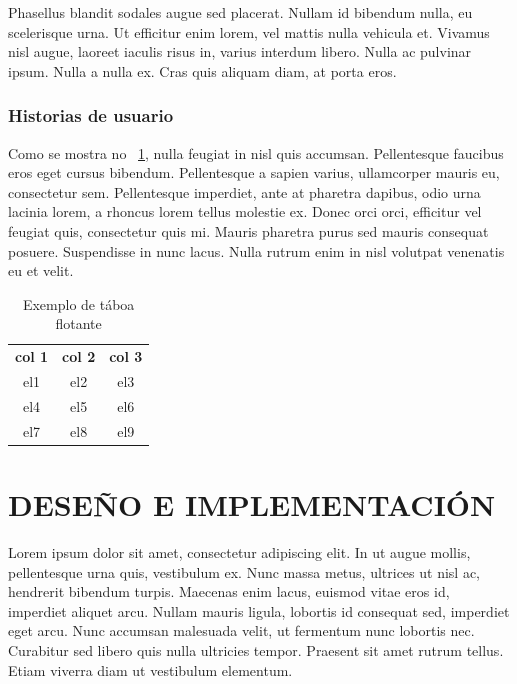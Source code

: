 \documentclass{pfc}
\begin{document}
Phasellus blandit sodales augue sed placerat. Nullam id bibendum
nulla, eu scelerisque urna. Ut efficitur enim lorem, vel mattis nulla
vehicula et. Vivamus nisl augue, laoreet iaculis risus in, varius
interdum libero. Nulla ac pulvinar ipsum. Nulla a nulla ex. Cras quis
aliquam diam, at porta eros.

\subsection{Historias de usuario}

Como se mostra no \tablename~\ref{tab:exemplo}, nulla feugiat in nisl
quis accumsan. Pellentesque faucibus eros eget cursus
bibendum. Pellentesque a sapien varius, ullamcorper mauris eu,
consectetur sem. Pellentesque imperdiet, ante at pharetra dapibus,
odio urna lacinia lorem, a rhoncus lorem tellus molestie ex. Donec
orci orci, efficitur vel feugiat quis, consectetur quis mi. Mauris
pharetra purus sed mauris consequat posuere. Suspendisse in nunc
lacus. Nulla rutrum enim in nisl volutpat venenatis eu et velit.

\begin{table}
  \centering
  \caption{Exemplo de táboa flotante}
  \begin{tabular}{ccc}
    \toprule
    {\bf col 1} & {\bf col 2} & {\bf col 3}\\
    el1 & el2 & el3\\
    el4 & el5 & el6\\
    el7 & el8 & el9\\
    \bottomrule
  \end{tabular}
  \label{tab:exemplo}
\end{table}



\chapter{DESEÑO E IMPLEMENTACIÓN}
\label{chap:des}

Lorem ipsum dolor sit amet, consectetur adipiscing elit. In ut augue
mollis, pellentesque urna quis, vestibulum ex. Nunc massa metus,
ultrices ut nisl ac, hendrerit bibendum turpis. Maecenas enim lacus,
euismod vitae eros id, imperdiet aliquet arcu. Nullam mauris ligula,
lobortis id consequat sed, imperdiet eget arcu. Nunc accumsan
malesuada velit, ut fermentum nunc lobortis nec. Curabitur sed libero
quis nulla ultricies tempor. Praesent sit amet rutrum tellus. Etiam
viverra diam ut vestibulum elementum.
\end{document}
